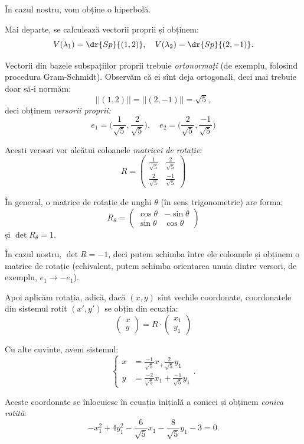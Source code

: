 În cazul nostru, vom obține o hiperbolă.

Mai departe, se calculează vectorii proprii și obținem:
\[
  V(\lambda_1) = \dr{Sp} \{(1, 2) \}, \quad V(\lambda_2) = \dr{Sp} \{(2, -1) \}.
\]

Vectorii din bazele subspațiilor proprii trebuie \emph{ortonormați} (de exemplu,
folosind procedura Gram-Schmidt). Observăm că ei sînt deja ortogonali, deci
mai trebuie doar să-i normăm:
\[
  ||(1, 2)|| = ||(2, -1)|| = \sqrt{5},
\]
deci obținem \emph{versorii proprii:}
\[
  e_1 = \Big(\frac{1}{\sqrt{5}}, \frac{2}{\sqrt{5}} \Big), \quad %
  e_2 = \Big(\frac{2}{\sqrt{5}}, \frac{-1}{\sqrt{5}} \Big)
\]

Acești versori vor alcătui coloanele \emph{matricei de rotație}:
\[
  R = \begin{pmatrix}
    \frac{1}{\sqrt{5}} & \frac{2}{\sqrt{5}} \\
    \frac{2}{\sqrt{5}} & \frac{-1}{\sqrt{5}}
  \end{pmatrix}
\]

În general, o matrice de rotație de unghi $ \theta $ (în sens trigonometric)
are forma:
\[
  R_\theta = \begin{pmatrix}
    \cos \theta & -\sin \theta \\
    \sin \theta & \cos \theta
  \end{pmatrix}
\]
și $ \det R_\theta = 1 $.

În cazul nostru, $ \det R = -1 $, deci putem schimba între ele coloanele
și obținem o matrice de rotație (echivalent, putem schimba orientarea unuia
dintre versori, de exemplu, $ e_1 \longrightarrow -e_1 $).

Apoi aplicăm rotația, adică, dacă $ (x, y) $ sînt vechile coordonate,
coordonatele din sistemul rotit $ (x', y') $ se obțin din ecuația:
\[
  \begin{pmatrix}
    x \\ y
  \end{pmatrix} = R \cdot \begin{pmatrix} x_1 \\ y_1 \end{pmatrix}
\]

Cu alte cuvinte, avem sistemul:
\[
  \begin{cases}
    x &= \frac{-1}{\sqrt{5}} x_ + \frac{2}{\sqrt{5}} y_1 \\
    y &= \frac{-2}{\sqrt{5}} x_1 + \frac{-1}{\sqrt{5}} y_1
  \end{cases}.
\]

Aceste coordonate se înlocuiesc în ecuația inițială a conicei și obținem
\emph{conica rotită}:
\[
  -x_1^2 + 4y_1^2 - \frac{6}{\sqrt{5}} x_1 - \frac{8}{\sqrt{5}} y_1 - 3 = 0.
\]

